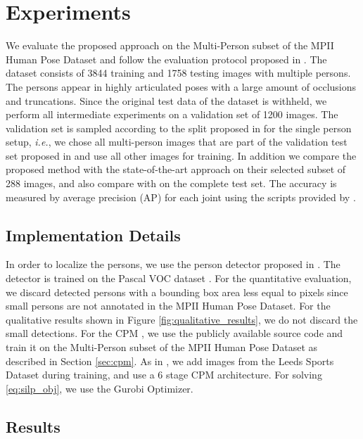 \documentclass[runningheads]{llncs}
\newcommand{\ie}{\mbox{\emph{i.e.}}}
\begin{document}
\section{Experiments}
We evaluate the proposed approach on the Multi-Person subset of the MPII Human Pose Dataset \cite{andriluka_cvpr2014} and follow the evaluation protocol proposed in \cite{pishchulin2015deepcut}. The dataset consists of 3844 training and 1758 testing images with multiple persons. The persons appear in highly articulated poses with a large amount of occlusions and truncations. Since the original test data of the dataset is withheld, we perform all intermediate experiments on a validation set of 1200 images. The validation set is sampled according to the split proposed in \cite{tompson_cvpr2015} for the single person setup, \ie, we chose all multi-person images that are part of the validation test set proposed in \cite{tompson_cvpr2015} and use all other images for training. In addition we compare the proposed method with the state-of-the-art approach \cite{pishchulin2015deepcut} on their selected subset of 288 images, and also compare with \cite{insafutdinov2016deepercut} on the complete test set. The accuracy is measured by average precision (AP) for each joint using the scripts provided by \cite{pishchulin2015deepcut}. 

\subsection{Implementation Details}
In order to localize the persons, we use the person detector proposed in \cite{ren2015faster}. The detector is trained on the Pascal VOC dataset \cite{Everingham15}. For the quantitative evaluation, we discard detected persons with a 
bounding box area less equal to  pixels since small persons are not annotated in the MPII Human Pose Dataset. For the qualitative results shown in Figure \ref{fig:qualitative_results}, we do not discard the small detections. 
For the CPM \cite{wei2016convolutional}, we use the publicly available source code and train it on the Multi-Person subset of the MPII Human Pose Dataset as described in Section \ref{sec:cpm}. As in \cite{wei2016convolutional}, we add images from the Leeds Sports Dataset \cite{Ever10} during training, and use a 6 stage  CPM architecture. For solving \eqref{eq:silp_obj}, we use the Gurobi Optimizer.

\subsection{Results}
\end{document}
